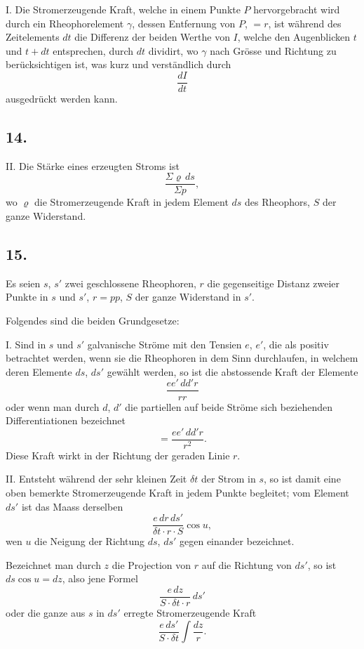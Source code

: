 \documentclass[fontsize=10pt,paper=a5,pagesize=auto]{scrbook}
\newcommand{\origpage}[1]{\marginpar{\footnotesize\textit{S. #1}}}
\begin{document}
\textsc{I.} Die Stromerzeugende Kraft, welche in einem Punkte $P$ hervorgebracht wird durch ein Rheophorelement $\gamma$, dessen Entfernung von $P$, $= r$, ist während des Zeitelements $dt$ die Differenz der beiden Werthe von $I$, welche den Augenblicken $t$ und $t + dt$ entsprechen, durch $dt$ dividirt, wo $\gamma$ nach Grösse und Richtung zu berücksichtigen ist, was kurz und verständlich durch
\[
\frac{dI}{dt}
\]
ausgedrückt werden kann.

\subsection*{14.}
\origpage{612}
\textsc{II.} Die Stärke eines erzeugten Stroms ist
\[
\frac{\Sigma \varrho \, ds}{\Sigma p},
\]
wo $\varrho$ die Stromerzeugende Kraft in jedem Element $ds$ des Rheophors, $S$ der ganze Widerstand.

\subsection*{15.}
\origpage{612}
Es seien $s$, $s'$ zwei geschlossene Rheophoren, $r$ die gegenseitige Distanz zweier Punkte in $s$ und $s'$, $r = pp$, $S$ der ganze Widerstand in $s'$.

Folgendes sind die beiden Grundgesetze:

\textsc{I.} Sind in $s$ und $s'$ galvanische Ströme mit den Tensien $e$, $e'$, die als positiv betrachtet werden, wenn sie die Rheophoren in dem Sinn durchlaufen, in welchem deren Elemente $ds$, $ds'$ gewählt werden, so ist die abstossende Kraft der Elemente
\[
\frac{ee' \, dd'r}{rr}
\]
oder wenn man durch $d$, $d'$ die partiellen auf beide Ströme sich beziehenden Differentiationen bezeichnet
\[
= \frac{ee' \, dd'r}{r^2}.
\]
Diese Kraft wirkt in der Richtung der geraden Linie $r$.

\textsc{II.} Entsteht während der sehr kleinen Zeit $\delta t$ der Strom in $s$, so ist damit eine oben bemerkte Stromerzeugende Kraft in jedem Punkte begleitet; vom Element $ds'$ ist das Maass derselben
\[
\frac{e \, dr \, ds'}{\delta t \cdot r \cdot S} \cos u,
\]
wen $u$ die Neigung der Richtung $ds$, $ds'$ gegen einander bezeichnet.

Bezeichnet man durch $z$ die Projection von $r$ auf die Richtung von $ds'$, so ist $ds \cos u = dz$, also jene Formel
\[
\frac{e \, dz}{S \cdot \delta t \cdot r} \, ds'
\]
oder die ganze aus $s$ in $ds'$ erregte Stromerzeugende Kraft
\[
\frac{e \, ds'}{S \cdot \delta t} \int \frac{dz}{r}.
\]
\end{document}
